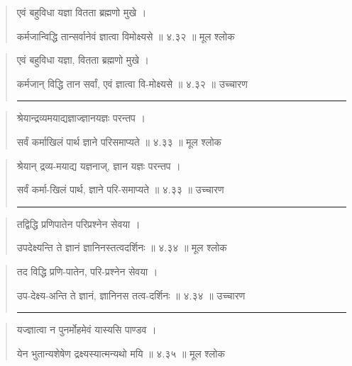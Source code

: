 \begin{quotation}

एवं बहुविधा यज्ञा वितता ब्रह्मणो मुखे  ।  

कर्मजान्विद्धि तान्सर्वानेवं ज्ञात्वा विमोक्ष्यसे  ॥ ४.३२ ॥  मूल श्लोक
\end{quotation}

\begin{quotation}

एवं बहुविधा यज्ञा, वितता ब्रह्मणो मुखे  ।  

कर्मजान् विद्धि तान सर्वां, एवं ज्ञात्वा वि-मोक्ष्यसे  ॥ ४.३२ ॥  उच्चारण

\noindent\rule{16cm}{0.4pt} 
\end{quotation}


\begin{quotation}

श्रेयान्द्रव्यमयाद्यज्ञाज्ज्ञानयज्ञः परन्तप  ।  

सर्वं कर्माखिलं पार्थ ज्ञाने परिसमाप्यते  ॥ ४.३३ ॥  मूल श्लोक
\end{quotation}

\begin{quotation}

श्रेयान् द्रव्य-मयाद्य यज्ञनाज्, ज्ञान यज्ञः परन्तप  ।  

सर्वं कर्मा-खिलं पार्थ, ज्ञाने परि-समाप्यते  ॥ ४.३३ ॥  उच्चारण

\noindent\rule{16cm}{0.4pt} 
\end{quotation}


\begin{quotation}

तद्विद्धि प्रणिपातेन परिप्रश्नेन सेवया  ।  

उपदेक्ष्यन्ति ते ज्ञानं ज्ञानिनस्तत्वदर्शिनः  ॥ ४.३४ ॥  मूल श्लोक
\end{quotation}

\begin{quotation}
तद विद्धि प्रणि-पातेन, परि-प्रश्नेन सेवया  ।  

उप-देक्ष्य-अन्ति ते ज्ञानं, ज्ञानिनस तत्व-दर्शिनः  ॥ ४.३४ ॥  उच्चारण

\noindent\rule{16cm}{0.4pt} 
\end{quotation}


\begin{quotation}

यज्ज्ञात्वा न पुनर्मोहमेवं यास्यसि पाण्डव  ।  

येन भुतान्यशेषेण द्रक्ष्यस्यात्मन्यथो मयि  ॥ ४.३५ ॥  मूल श्लोक
\end{quotation}

